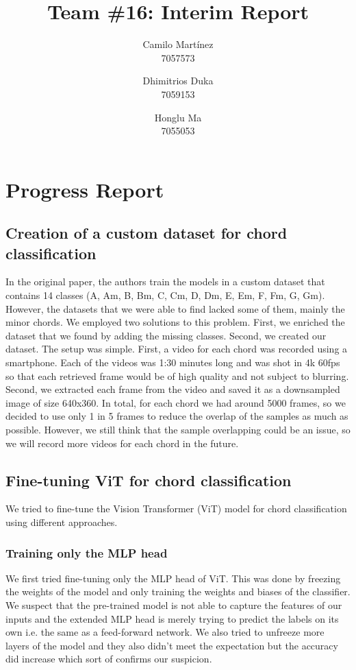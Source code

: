 \documentclass[10pt,twocolumn,letterpaper]{article}
\begin{document}
\title{Team \#16: Interim Report} 

\author{
 Camilo Martínez\\
 7057573\\
    \and
 Dhimitrios Duka\\
 7059153\\
    \and
 Honglu Ma\\
 7055053\\
}
\maketitle

\section{Progress Report}


\subsection{Creation of a custom dataset for chord classification}
In the original paper, the authors train the models in a custom dataset that contains 14 classes (A, Am, B, Bm, C, Cm, D, Dm, E, Em, F, Fm, G, Gm). However, the datasets that we were able to find lacked some of them, mainly the minor chords. We employed two solutions to this problem. First, we enriched the dataset that we found by adding the missing classes. Second, we created our dataset. The setup was simple. First, a video for each chord was recorded using a smartphone. Each of the videos was 1:30 minutes long and was shot in 4k 60fps so that each retrieved frame would be of high quality and not subject to blurring. Second, we extracted each frame from the video and saved it as a downsampled image of size 640x360. In total, for each chord we had around 5000 frames, so we decided to use only 1 in 5 frames to reduce the overlap of the samples as much as possible. However, we still think that the sample overlapping could be an issue, so we will record more videos for each chord in the future.

\subsection{Fine-tuning ViT for chord classification}
We tried to fine-tune the Vision Transformer (ViT) model for chord classification using different approaches.

\subsubsection{Training only the MLP head}
We first tried fine-tuning only the MLP head of ViT. This was done by freezing the weights of the model and only training the weights and biases of the classifier. We suspect that the pre-trained model is not able to capture the features of our inputs and the extended MLP head is merely trying to predict the labels on its own i.e. the same as a feed-forward network. We also tried to unfreeze more layers of the model and they also didn't meet the expectation but the accuracy did increase which sort of confirms our suspicion.
\end{document}
